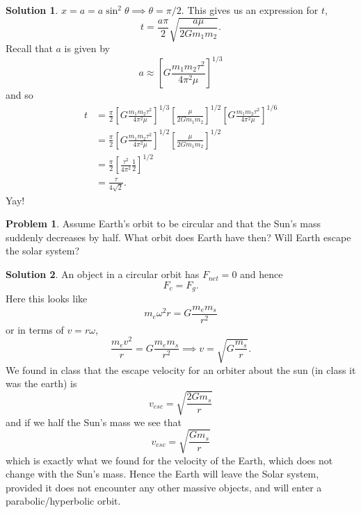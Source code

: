 \documentclass[10pt]{article}
\theoremstyle{definition}
\newtheorem{problem}{Problem}
\newtheorem{soln}{Solution}
\begin{document}
\begin{soln}
  $x=a=a\sin^2\theta\implies \theta=\pi/2$. This gives us an expression for $t$,
  $$t=\frac{a\pi}{2}\sqrt{\frac{a\mu}{2Gm_1m_2}}.$$
  Recall that $a$ is given by
  $$a\approx\left[G\frac{m_1m_2 \tau^2}{4\pi^2\mu}\right]^{1/3}$$
  and so
  \begin{align*}
    t & = \frac{\pi}{2}\left[G\frac{m_1m_2 \tau^2}{4\pi^2\mu}\right]^{1/3}\left[\frac{\mu}{2Gm_1m_2}\right]^{1/2}\left[G\frac{m_1m_2 \tau^2}{4\pi^2\mu}\right]^{1/6} \\
      & = \frac{\pi}{2}\left[G\frac{m_1m_2 \tau^2}{4\pi^2\mu}\right]^{1/2}\left[\frac{\mu}{2Gm_1m_2}\right]^{1/2}                                                    \\
      & = \frac{\pi}{2}\left[\frac{ \tau^2}{4\pi^2}\frac{1}{2}\right]^{1/2}                                                                                          \\
      & = \frac{\tau}{4\sqrt{2}}.
  \end{align*}
  Yay!
\end{soln}

\begin{problem}
Assume Earth's orbit to be circular and that the Sun's mass suddenly decreases by half.
What orbit does Earth have then? Will Earth escape the solar system?
\end{problem}
\begin{soln}
  An object in a circular orbit has $F_{net}=0$ and hence
  $$F_c=F_g.$$
  Here this looks like
  $$m_e\omega^2 r=G\frac{m_em_s}{r^2}$$
  or in terms of $v=r\omega$,
  $$\frac{m_e v^2}{r}=G\frac{m_em_s}{r^2}\implies v=\sqrt{G\frac{m_s}{r}}.$$
  We found in class that the escape velocity for an orbiter about the sun (in class it was the earth) is
  $$v_{esc}=\sqrt{\frac{2Gm_s}{r}}$$
  and if we half the Sun's mass we see that
  $$v_{esc}=\sqrt{\frac{Gm_s}{r}}$$
  which is exactly what we found for the velocity of the Earth, which does not change with the Sun's mass. Hence the Earth will leave the Solar system,
  provided it does not encounter any other massive objects, and will enter a parabolic/hyperbolic orbit.
\end{soln}
\end{document}

